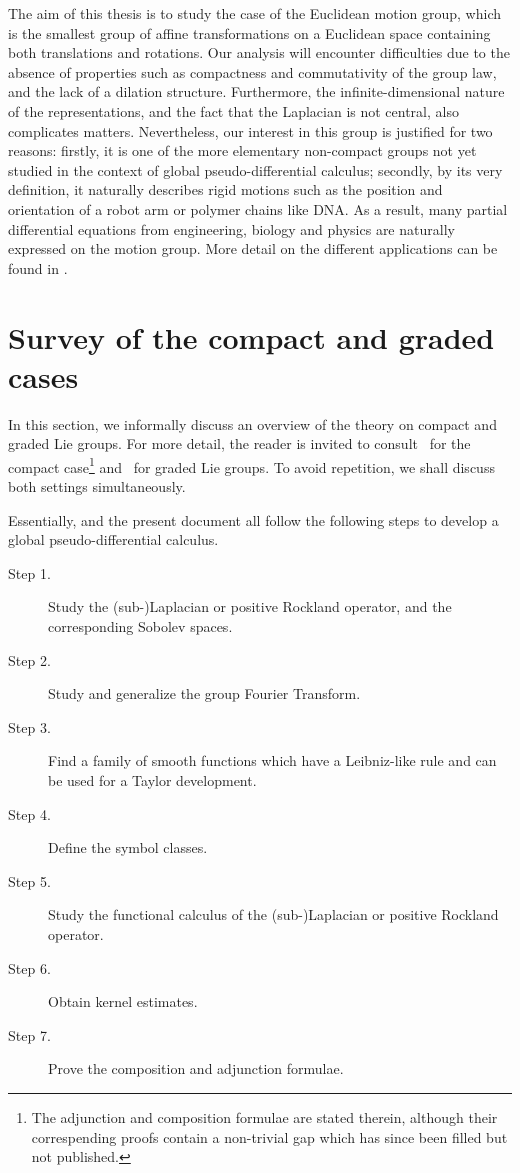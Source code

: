 The aim of this thesis is to study the case of the Euclidean motion group,
which is the smallest group of affine transformations on a Euclidean space containing both translations and rotations.
Our analysis will encounter difficulties due to the absence of properties such as compactness and commutativity of the group law,
and the lack of a dilation structure.
Furthermore, the infinite-dimensional nature of the representations,
and the fact that the Laplacian is not central, also complicates matters.
Nevertheless, our interest in this group is justified for two reasons:
firstly, it is one of the more elementary non-compact groups not yet studied in the context of global pseudo-differential calculus;
secondly, by its very definition,
it naturally describes rigid motions such as the position and orientation of a robot arm or polymer chains like DNA.
As a result,
many partial differential equations from engineering, biology and physics
are naturally expressed on the motion group.
More detail on the different applications can be found in \cite{ChirikjianWang04,ChirikjianKyatkin00,Chirikjian13}.

\section{Survey of the compact and graded cases}

In this section,
we informally discuss an overview of the theory on compact and graded Lie groups.
For more detail,
the reader is invited to consult~\cite{RuzhanskyTurunen10} for the compact case\footnote{%
    The adjunction and composition formulae are stated therein,
    although their correspending proofs contain a non-trivial gap which has since been filled but not published.
}
and~\cite{FischerRuzhansky16} for graded Lie groups.
To avoid repetition,
we shall discuss both settings simultaneously.

Essentially,
\cite{Fischer2015,FischerRuzhansky16} and the present document
all follow the following steps
to develop a global pseudo-differential calculus.

\begin{description}
    \item[Step 1.] Study the (sub-)Laplacian or positive Rockland operator,
        and the corresponding Sobolev spaces.
    \item[Step 2.] Study and generalize the group Fourier Transform.
    \item[Step 3.] Find a family of smooth functions which have a Leibniz-like rule and can be used for a Taylor development.
    \item[Step 4.] Define the symbol classes.
    \item[Step 5.] Study the functional calculus of the (sub-)Laplacian or positive Rockland operator.
    \item[Step 6.] Obtain kernel estimates.
    \item[Step 7.] Prove the composition and adjunction formulae.
\end{description}

